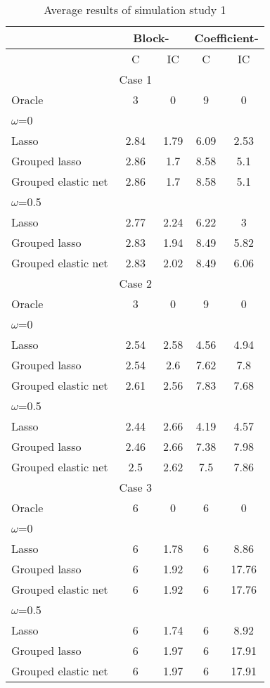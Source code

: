 \documentclass[paper=a4, fontsize=11pt]{scrartcl} %
\begin{document}
\begin{table}
\centering
\caption{Average results of simulation study 1}
\label{table2}
\begin{tabular}{@{}lcccc@{}}
\toprule
 & \multicolumn{2}{c}{Block-} & \multicolumn{2}{c}{Coefficient-} \\ \midrule
 & C & IC & C & IC \\ \midrule
 & Case 1 &  &  &  \\ \midrule
Oracle & 3 & 0 & 9 & 0 \\
$\omega$=0 &  &  &  &  \\
Lasso & 2.84 & 1.79 & 6.09 & 2.53 \\
Grouped lasso & 2.86 & 1.7 & 8.58 & 5.1 \\
Grouped elastic net & 2.86 & 1.7 & 8.58 & 5.1 \\
$\omega$=0.5 &  &  &  &  \\
Lasso & 2.77 & 2.24 & 6.22 & 3 \\
Grouped lasso & 2.83 & 1.94 & 8.49 & 5.82 \\
Grouped elastic net & 2.83 & 2.02 & 8.49 & 6.06 \\
 & Case 2 &  &  &  \\ \midrule
Oracle & 3 & 0 & 9 & 0 \\
$\omega$=0 &  &  &  &  \\
Lasso & 2.54 & 2.58 & 4.56 & 4.94 \\
Grouped lasso & 2.54 & 2.6 & 7.62 & 7.8 \\
Grouped elastic net & 2.61 & 2.56 & 7.83 & 7.68 \\
$\omega$=0.5 &  &  &  &  \\
Lasso & 2.44 & 2.66 & 4.19 & 4.57 \\
Grouped lasso & 2.46 & 2.66 & 7.38 & 7.98 \\
Grouped elastic net & 2.5 & 2.62 & 7.5 & 7.86 \\
 & Case 3 &  &  &  \\ \midrule
Oracle & 6 & 0 & 6 & 0 \\
$\omega$=0 &  &  &  &  \\
Lasso & 6 & 1.78 & 6 & 8.86 \\
Grouped lasso & 6 & 1.92 & 6 & 17.76 \\
Grouped elastic net & 6 & 1.92 & 6 & 17.76 \\
$\omega$=0.5 &  &  &  &  \\
Lasso & 6 & 1.74 & 6 & 8.92 \\
Grouped lasso & 6 & 1.97 & 6 & 17.91 \\
Grouped elastic net & 6 & 1.97 & 6 & 17.91 \\ \bottomrule
\end{tabular}
\end{table}
\end{document}
